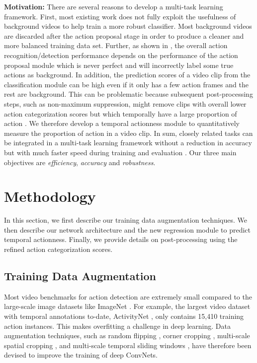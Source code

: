 \documentclass[10pt,twocolumn,letterpaper]{article}
\begin{document}
\noindent \textbf{Motivation:} 
There are several reasons to develop a multi-task learning framework. First, most existing work does not fully exploit the usefulness of background videos to help train a more robust classifier. Most background videos are discarded after the action proposal stage in order to produce a cleaner and more balanced training data set. Further, as shown in \cite{non_action_wang_cvpr16}, the overall action recognition/detection performance depends on the performance of the action proposal module which is never perfect and will incorrectly label some true actions as background. 
In addition,  the prediction scores of a video clip from the classification module can be high even if it only has a few action frames and the rest are background. This can be problematic because subsequent post-processing steps, such as non-maximum suppression, might remove clips with overall lower action categorization scores but which temporally have a large proportion of action \cite{scnn_shou_wang_chang_cvpr16}. 
We therefore develop a temporal actionness module to quantitatively measure the proportion of action in a video clip. 
In sum, closely related tasks can be integrated in a multi-task learning framework without a reduction in accuracy but with much faster speed during training and evaluation \cite{DAP3D2016,segment_multitask_cvpr16_dai,seq2seq_multitask_iclr16_luong,object_multitask_iccv15_ghifary}. 
Our three main objectives are \textit{efficiency}, \textit{accuracy} and \textit{robustness}.

\section{Methodology}
\label{sec:methodology}
In this section, we first describe our training data augmentation techniques. We then describe our network architecture and the new regression module to predict temporal actionness. Finally, we provide details on post-processing using the refined action categorization scores.

\subsection{Training Data Augmentation}
Most video benchmarks for action detection are extremely small compared to the large-scale image datasets like ImageNet \cite{imagenet_cvpr09}. For example, the largest video dataset with temporal annotations to-date, ActivityNet \cite{activityNet}, only contains 15,410 training action instances. This makes overfitting a challenge in deep learning. Data augmentation techniques, such as random flipping \cite{imagenet_deep_learning_nips12_alex}, corner cropping \cite{wanggoodpractice2015}, multi-scale spatial cropping \cite{sppnet,twostream2014}, and multi-scale temporal sliding windows \cite{scnn_shou_wang_chang_cvpr16}, have therefore been devised to improve the training of deep ConvNets.
\end{document}

